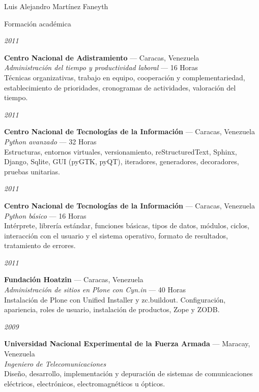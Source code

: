 \documentclass[11pt,letterpaper]{article}
\begin{document}
\begin{cv}{Luis Alejandro Mart\'inez Faneyth}
\begin{cvlist}{Formaci\'on acad\'emica}
\item[{\parbox[t]{6em}{\textit{\large{2011}}}}]{
	\parbox[t]{\linewidth}{
		\textbf{Centro Nacional de Adistramiento} --- Caracas, Venezuela\\
		\textit{Administraci\'on del tiempo y productividad laboral} --- 16 Horas\\
		\footnotesize{T\'ecnicas organizativas, trabajo en equipo, cooperaci\'on y complementariedad, establecimiento de prioridades, cronogramas de actividades, valoraci\'on del tiempo.}
	}
}
\item[{\parbox[t]{6em}{\textit{\large{2011}}}}]{
	\parbox[t]{\linewidth}{
		\textbf{Centro Nacional de Tecnolog\'ias de la Informaci\'on} --- Caracas, Venezuela\\
		\textit{Python avanzado} --- 32 Horas\\
		\footnotesize{Estructuras, entornos virtuales, versionamiento, reStructuredText, Sphinx, Django, Sqlite, GUI (pyGTK, pyQT), iteradores, generadores, decoradores, pruebas unitarias.}
	}
}
\item[{\parbox[t]{6em}{\textit{\large{2011}}}}]{
	\parbox[t]{\linewidth}{
		\textbf{Centro Nacional de Tecnolog\'ias de la Informaci\'on} --- Caracas, Venezuela\\
		\textit{Python b\'asico} --- 16 Horas\\
		\footnotesize{Int\'erprete, librer\'ia est\'andar, funciones b\'asicas, tipos de datos, m\'odulos, ciclos, interacci\'on con el usuario y el sistema operativo, formato de resultados, tratamiento de errores.}
	}
}
\item[{\parbox[t]{6em}{\textit{\large{2011}}}}]{
	\parbox[t]{\linewidth}{
		\textbf{Fundaci\'on Hoatzin} --- Caracas, Venezuela\\
		\textit{Administraci\'on de sitios en Plone con Cyn.in} --- 40 Horas\\
		\footnotesize{Instalaci\'on de Plone con Unified Installer y zc.buildout. Configuraci\'on, apariencia, roles de usuario, instalaci\'on de productos, Zope y ZODB.}
	}
}
\item[{\parbox[t]{6em}{\textit{\large{2009}}}}]{
	\parbox[t]{\linewidth}{
		\textbf{Universidad Nacional Experimental de la Fuerza Armada} --- Maracay, Venezuela\\
		\textit{Ingeniero de Telecomunicaciones}\\
		\footnotesize{Dise\~no, desarrollo, implementaci\'on y depuraci\'on de sistemas de comunicaciones el\'ectricos, electr\'onicos, electromagn\'eticos u \'opticos.}
	}
}
\end{cvlist}


\end{cv}
\end{document}
